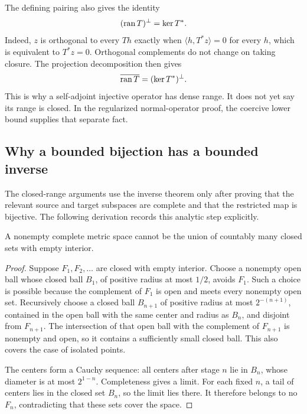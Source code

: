 \documentclass[11pt,oneside,openany]{book}
\numberwithin{equation}{section}
\begin{document}
The defining pairing also gives the identity
\begin{equation}\label{KS:eq:adjoint-range-orthogonal}
 (\operatorname{ran} T)^\perp=\ker T^*.
\end{equation}
Indeed, \(z\) is orthogonal to every \(Th\) exactly when \(\langle h,T^*z\rangle=0\) for every \(h\), which is equivalent to \(T^*z=0\). Orthogonal complements do not change on taking closure. The projection decomposition then gives
\[
 \overline{\operatorname{ran} T}=(\ker T^*)^\perp.
\]
This is why a self-adjoint injective operator has dense range. It does not yet say its range is closed. In the regularized normal-operator proof, the coercive lower bound supplies that separate fact.

\subsection{Why a bounded bijection has a bounded inverse}
The closed-range arguments use the inverse theorem only after proving that the relevant source and target subspaces are complete and that the restricted map is bijective. The following derivation records this analytic step explicitly.

\begin{KSlemma}\label{KS:lem:baire-tool}
A nonempty complete metric space cannot be the union of countably many closed sets with empty interior.
\end{KSlemma}
\begin{proof}
Suppose \(F_1,F_2,\ldots\) are closed with empty interior. Choose a nonempty open ball whose closed ball \(B_1\), of positive radius at most \(1/2\), avoids \(F_1\). Such a choice is possible because the complement of \(F_1\) is open and meets every nonempty open set. Recursively choose a closed ball \(B_{n+1}\) of positive radius at most \(2^{-(n+1)}\), contained in the open ball with the same center and radius as \(B_n\), and disjoint from \(F_{n+1}\). The intersection of that open ball with the complement of \(F_{n+1}\) is nonempty and open, so it contains a sufficiently small closed ball. This also covers the case of isolated points.

The centers form a Cauchy sequence: all centers after stage \(n\) lie in \(B_n\), whose diameter is at most \(2^{1-n}\). Completeness gives a limit. For each fixed \(n\), a tail of centers lies in the closed set \(B_n\), so the limit lies there. It therefore belongs to no \(F_n\), contradicting that these sets cover the space.
\end{proof}
\end{document}
